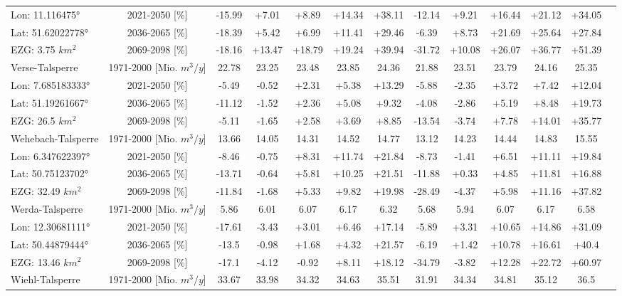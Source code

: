 \begin{longtable}{@{\extracolsep{\fill}}lc|ccccc||cccccc}
\cline{2-12} 
Lon: 11.116475° & 2021-2050 [\%]  & -15.99 & +7.01 & +8.89 & +14.34 & +38.11 & -12.14 & +9.21 & +16.44 & +21.12 & +34.05\\ 
Lat: 51.62022778° & 2036-2065 [\%]  & -18.39 & +5.42 & +6.99 & +11.41 & +29.46 & -6.39 & +8.73 & +21.69 & +25.64 & +27.84\\ 
EZG: 3.75 $km^2$ & 2069-2098 [\%]  & -18.16 & +13.47 & +18.79 & +19.24 & +39.94 & -31.72 & +10.08 & +26.07 & +36.77 & +51.39\\ 
\hline 
Verse-Talsperre & 1971-2000 [Mio. $m^3/y$]  & 22.78 & 23.25 & 23.48 & 23.85 & 24.36 & 21.88 & 23.51 & 23.79 & 24.16 & 25.35\\ 
\cline{2-12} 
Lon: 7.685183333° & 2021-2050 [\%]  & -5.49 & -0.52 & +2.31 & +5.38 & +13.29 & -5.88 & -2.35 & +3.72 & +7.42 & +12.04\\ 
Lat: 51.19261667° & 2036-2065 [\%]  & -11.12 & -1.52 & +2.36 & +5.08 & +9.32 & -4.08 & -2.86 & +5.19 & +8.48 & +19.73\\ 
EZG: 26.5 $km^2$ & 2069-2098 [\%]  & -5.11 & -1.65 & +2.58 & +3.69 & +8.85 & -13.54 & -3.74 & +7.78 & +14.01 & +35.77\\ 
\hline 
Wehebach-Talsperre & 1971-2000 [Mio. $m^3/y$]  & 13.66 & 14.05 & 14.31 & 14.52 & 14.77 & 13.12 & 14.23 & 14.44 & 14.83 & 15.55\\ 
\cline{2-12} 
Lon: 6.347622397° & 2021-2050 [\%]  & -8.46 & -0.75 & +8.31 & +11.74 & +21.84 & -8.73 & -1.41 & +6.51 & +11.11 & +19.84\\ 
Lat: 50.75123702° & 2036-2065 [\%]  & -13.71 & -0.64 & +5.81 & +10.25 & +21.51 & -11.88 & +0.33 & +4.85 & +11.81 & +16.88\\ 
EZG: 32.49 $km^2$ & 2069-2098 [\%]  & -11.84 & -1.68 & +5.33 & +9.82 & +19.98 & -28.49 & -4.37 & +5.98 & +11.16 & +37.82\\ 
\hline 
Werda-Talsperre & 1971-2000 [Mio. $m^3/y$]  & 5.86 & 6.01 & 6.07 & 6.17 & 6.32 & 5.68 & 5.94 & 6.07 & 6.17 & 6.58\\ 
\cline{2-12} 
Lon: 12.30681111° & 2021-2050 [\%]  & -17.61 & -3.43 & +3.01 & +6.46 & +17.14 & -5.89 & +3.31 & +10.65 & +14.86 & +31.09\\ 
Lat: 50.44879444° & 2036-2065 [\%]  & -13.5 & -0.98 & +1.68 & +4.32 & +21.57 & -6.19 & +1.42 & +10.78 & +16.61 & +40.4\\ 
EZG: 13.46 $km^2$ & 2069-2098 [\%]  & -17.1 & -4.12 & -0.92 & +8.11 & +18.12 & -34.79 & -3.82 & +12.28 & +22.72 & +60.97\\ 
\hline 
Wiehl-Talsperre & 1971-2000 [Mio. $m^3/y$]  & 33.67 & 33.98 & 34.32 & 34.63 & 35.51 & 31.91 & 34.34 & 34.81 & 35.12 & 36.5\\ 

\end{longtable}

